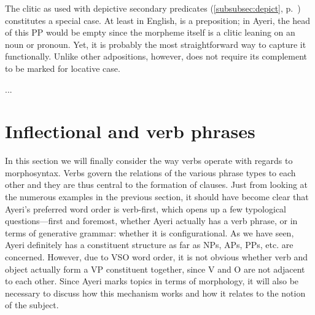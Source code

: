 \label{phsec:kuprep}
The clitic  as used with depictive secondary predicates
(\autoref{subsubsec:depict}, p.~\pageref{subsubsec:depict}) constitutes a
special case. At least in English,  is a preposition; in Ayeri, the head
of this PP would be empty since the morpheme itself is a clitic leaning on an
noun or pronoun. Yet, it is probably the most straightforward way to capture it
functionally. Unlike other adpositions, however,  does not
require its complement to be marked for locative case.

...

\section{Inflectional and verb phrases}
\label{sec:ips-vps}

In this section we will finally consider the way verbs operate with regards to
morphosyntax. Verbs govern the relations of the various phrase types to each
other and they are thus central to the formation of clauses. Just from looking
at the numerous examples in the previous section, it should have become clear
that Ayeri's preferred word order is verb-first, which opens up a few
typological questions---first and foremost, whether Ayeri actually has a verb
phrase, or in terms of generative grammar: whether it is configurational. As we
have seen, Ayeri definitely has a constituent structure as far as NPs, APs,
PPs, etc. are concerned. However, due to VSO word order, it is not obvious
whether verb and object actually form a VP constituent together, since V and O
are not adjacent to each other. Since Ayeri marks topics in terms of
morphology, it will also be necessary to discuss how this mechanism works and
how it relates to the notion of the subject.

